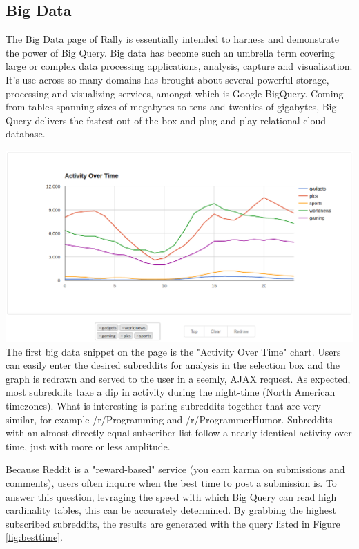 \documentclass[msc,oneside]{ubcthesis}%
\begin{document}
\subsection{Big Data}
The Big Data page of Rally is essentially intended to harness and demonstrate the power of Big Query. Big data has become such an umbrella term covering large or complex data processing applications, analysis, capture and visualization. It's use across so many domains has brought about several powerful storage, processing and visualizing services, amongst which is Google BigQuery. Coming from tables spanning sizes of megabytes to tens and twenties of gigabytes, Big Query delivers the fastest out of the box and plug and play relational cloud database.
\par
\includegraphics[width=\textwidth]{bigquery.png}
The first big data snippet on the page is the "Activity Over Time" chart. Users can easily enter the desired subreddits for analysis in the selection box and the graph is redrawn and served to the user in a seemly, AJAX request. As expected, most subreddits take a dip in activity during the night-time (North American timezones). What is interesting is paring subreddits together that are very similar, for example /r/Programming and /r/ProgrammerHumor. Subreddits with an almost directly equal subscriber list follow a nearly identical activity over time, just with more or less amplitude.
\par
Because Reddit is a "reward-based" service (you earn karma on submissions and comments), users often inquire when the best time to post a submission is. To answer this question, levraging the speed with which Big Query can read high cardinality tables, this can be accurately determined. By grabbing the highest subscribed subreddits, the results are generated with the query listed in Figure \ref{fig:besttime}.
\end{document}
